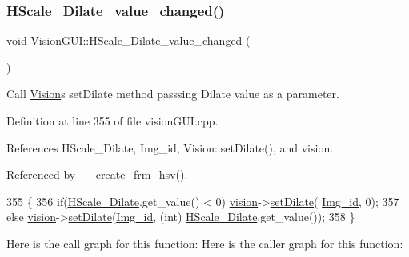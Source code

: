 \subsubsection{\texorpdfstring{H\+Scale\+\_\+\+Dilate\+\_\+value\+\_\+changed()}{HScale\_Dilate\_value\_changed()}}
{\footnotesize\ttfamily void Vision\+G\+U\+I\+::\+H\+Scale\+\_\+\+Dilate\+\_\+value\+\_\+changed (\begin{DoxyParamCaption}{ }\end{DoxyParamCaption})\hspace{0.3cm}{\ttfamily [private]}}



Call \hyperlink{class_vision}{Vision}\textquotesingle{}s set\+Dilate method passsing Dilate value as a parameter. 



Definition at line 355 of file vision\+G\+U\+I.\+cpp.



References H\+Scale\+\_\+\+Dilate, Img\+\_\+id, Vision\+::set\+Dilate(), and vision.



Referenced by \+\_\+\+\_\+create\+\_\+frm\+\_\+hsv().


\begin{DoxyCode}
355                                             \{
356     \textcolor{keywordflow}{if}(\hyperlink{class_vision_g_u_i_a6a7c757a11a2699e841b6b49fe18d1de}{HScale\_Dilate}.get\_value() < 0) \hyperlink{class_vision_g_u_i_a36aba058af844ec6cbe0c945c616cd5f}{vision}->\hyperlink{class_vision_a5a763aa322837556ab83f39ffb7e9391}{setDilate}(
      \hyperlink{class_vision_g_u_i_a4a46f114bc58e0f1d56b655f4bc8f9d8}{Img\_id}, 0);
357     \textcolor{keywordflow}{else} \hyperlink{class_vision_g_u_i_a36aba058af844ec6cbe0c945c616cd5f}{vision}->\hyperlink{class_vision_a5a763aa322837556ab83f39ffb7e9391}{setDilate}(\hyperlink{class_vision_g_u_i_a4a46f114bc58e0f1d56b655f4bc8f9d8}{Img\_id}, (\textcolor{keywordtype}{int}) \hyperlink{class_vision_g_u_i_a6a7c757a11a2699e841b6b49fe18d1de}{HScale\_Dilate}.get\_value());
358 \}
\end{DoxyCode}
Here is the call graph for this function\+:
Here is the caller graph for this function\+:
\mbox{\label{class_vision_g_u_i_a945e5a987bdfb5b1d5d97bd18231d211}} 

